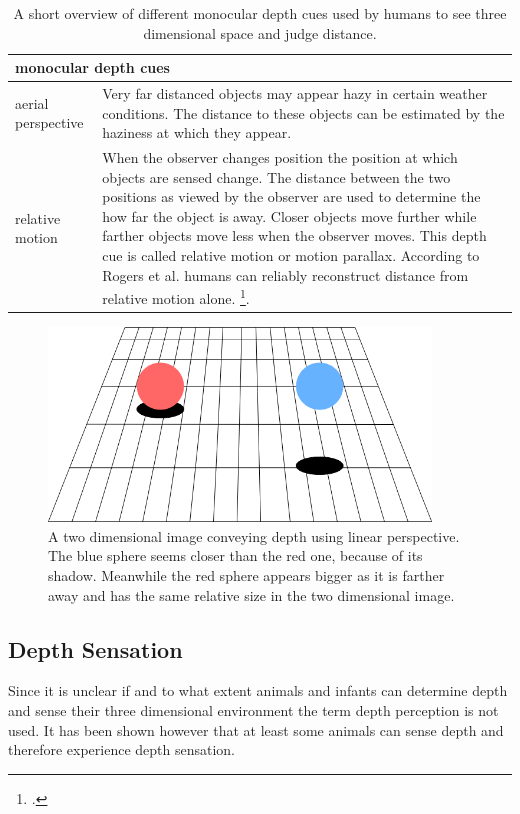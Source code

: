 \begin{table}[h!]
	\begin{tabularx}{\textwidth}{|l|X|}
		\hline
		\multicolumn{2}{|l|}{\textbf{monocular depth cues}} \\
		\hline
		aerial perspective & Very far distanced objects may appear hazy in certain weather conditions. The distance to these objects can be estimated by the haziness at which they appear.
		\\
		\hline
		relative motion & When the observer changes position the position at which objects are sensed change. The distance between the two positions as viewed by the observer are used to determine the how far the object is away. Closer objects move further while farther objects move less when the observer moves. This depth cue is called relative motion or motion parallax. According to Rogers et al. humans can reliably reconstruct distance from relative motion alone. \footcite{Rogers_Motion_parallax_as_an_independent_cue_for_depth_perception}.
		\\
		\hline
	\end{tabularx}
	\label{tab:study_of_literature_monocular_depth_cues2}
	\caption{A short overview of different monocular depth cues used by humans to see three dimensional space and judge distance.}
\end{table}

\begin{figure}[h!]
	\centering
	\includegraphics[width=4in]{img/study_of_literature_depth_perception_two_shperes.png}
	\caption{A two dimensional image conveying depth using linear perspective. The blue sphere seems closer than the red one, because of its shadow. Meanwhile the red sphere appears bigger as it is farther away and has the same relative size in the two dimensional image.}
	\label{pic:study_of_literature_depth_perception_two_shperes}
\end{figure}

\newpage

\subsection{Depth Sensation}
Since it is unclear if and to what extent animals and infants can determine depth and sense their three dimensional environment the term depth perception is not used. It has been shown however that at least some animals can sense depth and therefore experience depth sensation.


